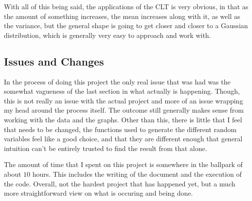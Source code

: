 \documentclass[a4paper, 11pt]{article}
\begin{document}
\medskip
\noindent
With all of this being said, the applications of the CLT is very obvious, in that as the amount of something increases, the mean increases along with it, as well as the variance, but the general shape is going to get closer and closer to a Gaussian distribution, which is generally very easy to approach and work with.
\subsection{Issues and Changes}
\label{sec:org7e37b8f}
In the process of doing this project the only real issue that was had was the somewhat vagueness of the last section in what actually is happening. Though, this is not really an issue with the actual project and more of an issue wrapping my head around the process itself. The outcome still generally makes sense from working with the data and the graphs.
Other than this, there is little that I feel that needs to be changed, the functions used to generate the different random variables feel like a good choice, and that they are different enough that general intuition can't be entirely trusted to find the result from that alone.

\medskip
\noindent
The amount of time that I spent on this project is somewhere in the ballpark of about \(10\) hours. This includes the writing of the document and the execution of the code. Overall, not the hardest project that has happened yet, but a much more straightforward view on what is occuring and being done.
\end{document}
